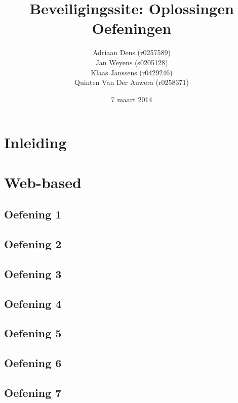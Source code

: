 \documentclass[a4paper,11pt]{report}
\begin{document}
\title{Beveiligingssite: Oplossingen Oefeningen}
\date{7 maart 2014}
\author{Adriaan Dens (r0257589)\\
	Jan Weyens (s0205128)\\
	Klaas Janssens (r0429246)\\
	Quinten Van Der Auwera (r0258371)
}	

\maketitle

\tableofcontents

\chapter{Inleiding}

\newpage

\chapter{Web-based}
\section{Oefening 1}

\section{Oefening 2}

\section{Oefening 3}

\section{Oefening 4}

\section{Oefening 5}

\section{Oefening 6}

\section{Oefening 7}

\end{document}
